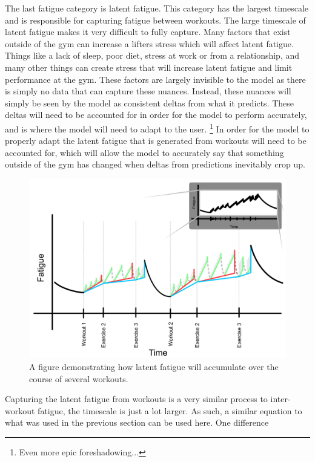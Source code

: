 The last fatigue category is latent fatigue. This category has the largest timescale and is responsible for capturing fatigue between workouts. The large timescale of latent fatigue makes it very difficult to fully capture. Many factors that exist outside of the gym can increase a lifters stress which will affect latent fatigue. Things like a lack of sleep, poor diet, stress at work or from a relationship, and many other things can create stress that will increase latent fatigue and limit performance at the gym. These factors are largely invisible to the model as there is simply no data that can capture these nuances. Instead, these nuances will simply be seen by the model as consistent deltas from what it predicts. These deltas will need to be accounted for in order for the model to perform accurately, and is where the model will need to adapt to the user. \footnote{Even more epic foreshadowing...} In order for the model to properly adapt the latent fatigue that is generated from workouts will need to be accounted for, which will allow the model to accurately say that something outside of the gym has changed when deltas from predictions inevitably crop up.

\begin{figure}[htb]
    \centering
    \includegraphics[scale=0.55]{images/p2/ch1/LatentFatigue.png}
    \caption{A figure demonstrating how latent fatigue will accumulate over the course of several workouts.}
    \label{fig:P2C1_LatentFatigue}
\end{figure}

Capturing the latent fatigue from workouts is a very similar process to inter-workout fatigue, the timescale is just a lot larger. As such, a similar equation to what was used in the previous section can be used here. One difference 

